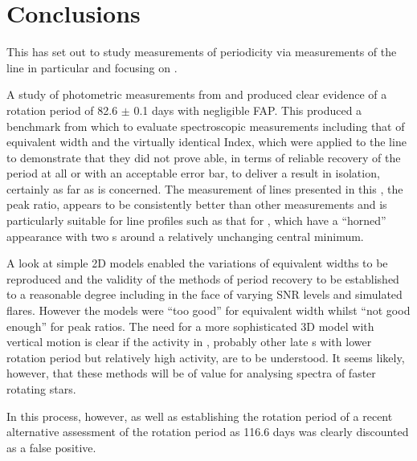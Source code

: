 \chapter{Conclusions}
\protect\label{chapter:conclusions}

This {\paperorthesis} has set out to study measurements of periodicity via measurements of the {\ha} line in particular
and focusing on \prox.

A study of photometric measurements from {\asas} and {\hst} produced clear evidence of a rotation period of 82.6 $\pm$
0.1 days with negligible FAP. This produced a benchmark from which to evaluate spectroscopic measurements including that
of equivalent width and the virtually identical {\ha} Index, which were applied to the {\ha} line to demonstrate that
they did not prove able, in terms of reliable recovery of the period at all or with an acceptable error bar, to deliver
a result in isolation, certainly as far as {\prox} is concerned. The measurement of lines presented in this
\paperorthesis, the peak ratio, appears to be consistently better than other measurements and is particularly suitable
for {\ha} line profiles such as that for \prox, which have a ``horned'' appearance with two \horn s around a relatively
unchanging central minimum.

A look at simple 2D models enabled the variations of equivalent widths to be reproduced and the validity of the methods
of period recovery to be established to a reasonable degree including in the face of varying SNR levels and simulated
flares. However the models were ``too good'' for equivalent width whilst ``not good enough'' for peak ratios. The need
for a more sophisticated 3D model with vertical motion is clear if the activity in \prox, probably other late \rdwarf s
with lower rotation period but relatively high activity, are to be understood. It seems likely, however, that these
methods will be of value for analysing spectra of faster rotating stars.


In this process, however, as well as establishing the rotation period of {\prox}  a recent alternative assessment of the rotation period as 116.6 days was clearly discounted as a false
positive.
